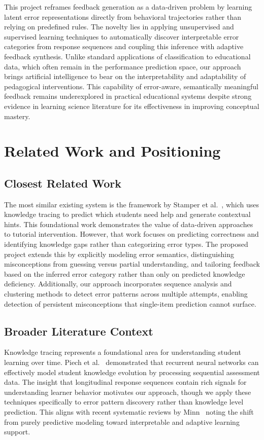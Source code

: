 \documentclass[conference]{IEEEtran}
\begin{document}
This project reframes feedback generation as a data-driven problem by learning latent error representations directly from behavioral trajectories rather than relying on predefined rules. The novelty lies in applying unsupervised and supervised learning techniques to automatically discover interpretable error categories from response sequences and coupling this inference with adaptive feedback synthesis. Unlike standard applications of classification to educational data, which often remain in the performance prediction space, our approach brings artificial intelligence to bear on the interpretability and adaptability of pedagogical interventions. This capability of error-aware, semantically meaningful feedback remains underexplored in practical educational systems despite strong evidence in learning science literature for its effectiveness in improving conceptual mastery.

\section{Related Work and Positioning}

\subsection{Closest Related Work}

The most similar existing system is the framework by Stamper et al.~\cite{stamper2011}, which uses knowledge tracing to predict which students need help and generate contextual hints. This foundational work demonstrates the value of data-driven approaches to tutorial intervention. However, that work focuses on predicting correctness and identifying knowledge gaps rather than categorizing error types. The proposed project extends this by explicitly modeling error semantics, distinguishing misconceptions from guessing versus partial understanding, and tailoring feedback based on the inferred error category rather than only on predicted knowledge deficiency. Additionally, our approach incorporates sequence analysis and clustering methods to detect error patterns across multiple attempts, enabling detection of persistent misconceptions that single-item prediction cannot surface.

\subsection{Broader Literature Context}

Knowledge tracing represents a foundational area for understanding student learning over time. Piech et al.~\cite{piech2015} demonstrated that recurrent neural networks can effectively model student knowledge evolution by processing sequential assessment data. The insight that longitudinal response sequences contain rich signals for understanding learner behavior motivates our approach, though we apply these techniques specifically to error pattern discovery rather than knowledge level prediction. This aligns with recent systematic reviews by Minn~\cite{minn2021} noting the shift from purely predictive modeling toward interpretable and adaptive learning support.
\end{document}
